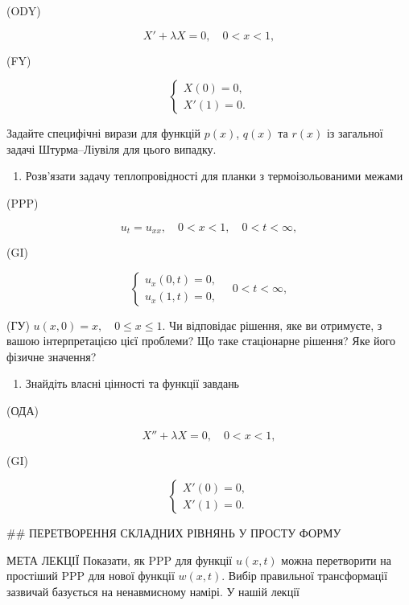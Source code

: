 \documentclass[
  ukrainian,
]{article}
\providecommand{\tightlist}{%
  \setlength{\itemsep}{0pt}\setlength{\parskip}{0pt}}
\begin{document}
(ODY)

\[
X' + \lambda X = 0, \quad 0 < x < 1,
\]

(FY)

\[
\begin{cases} X(0) = 0, \\ X'(1) = 0. \end{cases}
\]

Задайте специфічні вирази для функцій \(p(x)\), \(q(x)\) та \(r(x)\) із
загальної задачі Штурма--Ліувіля для цього випадку.

\begin{enumerate}
\def\labelenumi{\arabic{enumi}.}
\setcounter{enumi}{2}
\tightlist
\item
  Розв'язати задачу теплопровідності для планки з термоізольованими
  межами
\end{enumerate}

(PPP)

\[
u_t = u_{xx}, \quad 0 < x < 1, \quad 0 < t < \infty,
\]

(GI)

\[
\begin{cases} u_x (0, t) = 0, \\ u_x (1, t) = 0, \end{cases} \quad 0 < t < \infty,
\]

(ГУ) \(u(x, 0) = x, \quad 0 \le x \le 1.\) Чи відповідає рішення, яке ви
отримуєте, з вашою інтерпретацією цієї проблеми? Що таке стаціонарне
рішення? Яке його фізичне значення?

\begin{enumerate}
\def\labelenumi{\arabic{enumi}.}
\setcounter{enumi}{3}
\tightlist
\item
  Знайдіть власні цінності та функції завдань
\end{enumerate}

(ОДА)

\[
X'' + \lambda X = 0, \quad 0 < x < 1,
\]

(GI)

\[
\begin{cases} X'(0) = 0, \\ X'(1) = 0. \end{cases}
\]

\#\# ПЕРЕТВОРЕННЯ СКЛАДНИХ РІВНЯНЬ У ПРОСТУ ФОРМУ

МЕТА ЛЕКЦІЇ Показати, як PPP для функції \(u(x, t)\) можна перетворити
на простіший PPP для нової функції \(w(x, t)\). Вибір правильної
трансформації зазвичай базується на ненавмисному намірі. У нашій лекції
\end{document}
